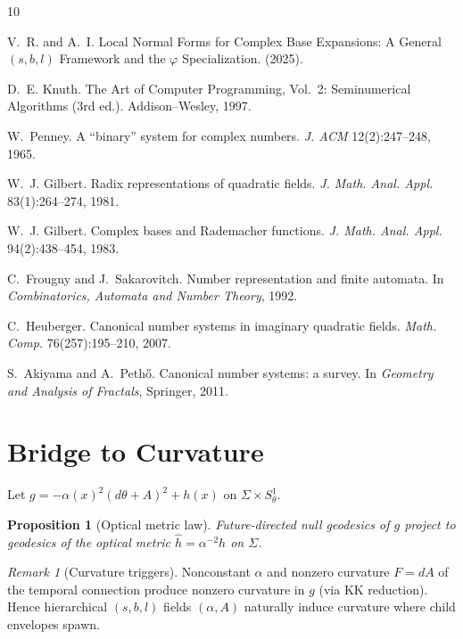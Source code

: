 \documentclass[11pt]{article}
\newtheorem{proposition}[theorem]{Proposition}
\theoremstyle{definition}
\theoremstyle{remark}
\newtheorem{remark}[theorem]{Remark}
\begin{document}
\begin{thebibliography}{10}

V.~R. and A.~I.
\newblock Local Normal Forms for Complex Base Expansions: A General $(s,b,l)$ Framework and the $\varphi$ Specialization.
\newblock (2025).

D.~E. Knuth.
\newblock The Art of Computer Programming, Vol.~2: Seminumerical Algorithms (3rd ed.).
\newblock Addison--Wesley, 1997.

W.~Penney.
\newblock A ``binary'' system for complex numbers.
\newblock \emph{J. ACM} 12(2):247--248, 1965.

W.~J. Gilbert.
\newblock Radix representations of quadratic fields.
\newblock \emph{J. Math. Anal. Appl.} 83(1):264--274, 1981.

W.~J. Gilbert.
\newblock Complex bases and {R}ademacher functions.
\newblock \emph{J. Math. Anal. Appl.} 94(2):438--454, 1983.

C.~Frougny and J.~Sakarovitch.
\newblock Number representation and finite automata.
\newblock In \emph{Combinatorics, Automata and Number Theory}, 1992.

C.~Heuberger.
\newblock Canonical number systems in imaginary quadratic fields.
\newblock \emph{Math. Comp.} 76(257):195--210, 2007.

S.~Akiyama and A.~Peth\H{o}.
\newblock Canonical number systems: a survey.
\newblock In \emph{Geometry and Analysis of Fractals}, Springer, 2011.

\end{thebibliography}


\section{Bridge to Curvature}
\label{sec:bridge-gr}
Let $g=-\alpha(x)^2(d\theta+A)^2+h(x)$ on $\Sigma\times S^1_\theta$.

\begin{proposition}[Optical metric law]
Future-directed null geodesics of $g$ project to geodesics of the optical metric $\hat h=\alpha^{-2}h$ on $\Sigma$.
\end{proposition}

\begin{remark}[Curvature triggers]
Nonconstant $\alpha$ and nonzero curvature $F=dA$ of the temporal connection produce nonzero curvature in $g$ (via KK reduction). Hence hierarchical $(s,b,l)$ fields $(\alpha,A)$ naturally induce curvature where child envelopes spawn.
\end{remark}
\end{document}
